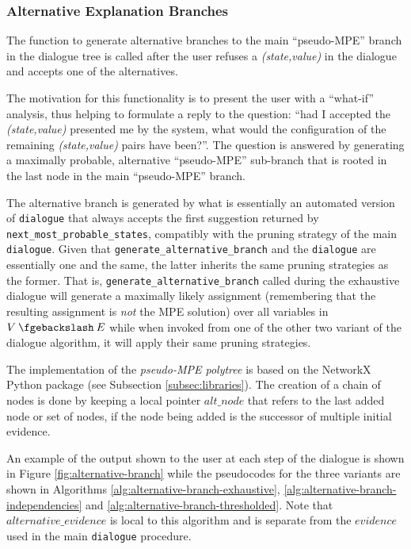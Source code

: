 \subsubsection{Alternative Explanation Branches}
The function to generate alternative branches to the main \enquote{pseudo-MPE} branch in the dialogue tree is called after the user refuses a \textit{(state,value)} in the dialogue and accepts one of the alternatives.

The motivation for this functionality is to present the user with a \enquote{what-if} analysis, thus helping  to formulate a reply to the question: \enquote{had I accepted the \textit{(state,value)} presented me by the system, what would the configuration of the remaining \textit{(state,value)} pairs have been?}.
The question is answered by generating a maximally probable, alternative \enquote{pseudo-MPE} sub-branch that is rooted in the last node in the main \enquote{pseudo-MPE} branch.

The alternative branch is generated by what is essentially an automated version of \texttt{dialogue} that always accepts the first suggestion returned by \texttt{next\_most\_probable\_states}, compatibly with the pruning strategy of the main \texttt{dialogue}.
Given that \texttt{generate\_alternative\_branch} and the \texttt{dialogue} are essentially one and the same, the latter inherits the same pruning strategies as the former.
That is, \texttt{generate\_alternative\_branch} called during the exhaustive dialogue will generate a maximally likely assignment (remembering that the resulting assignment is \textit{not} the MPE solution) over all variables in $V \mysetminus E$ while when invoked from one of the other two variant of the dialogue algorithm, it will apply their same pruning strategies.

The implementation of the \textit{pseudo-MPE polytree} is based on the NetworkX Python package (see Subsection \ref{subsec:libraries}).
The creation of a chain of nodes is done by keeping a local pointer $alt\_node$ that refers to the last added node or set of nodes, if the node being added is the successor of multiple initial evidence. 

An example of the output shown to the user at each step of the dialogue is shown in Figure \ref{fig:alternative-branch} while the pseudocodes for the three variants are shown in Algorithms \ref{alg:alternative-branch-exhaustive}, \ref{alg:alternative-branch-independencies} and \ref{alg:alternative-branch-thresholded}.
Note that $alternative\_evidence$ is local to this algorithm and is separate from the $evidence$ used in the main \texttt{dialogue} procedure.

